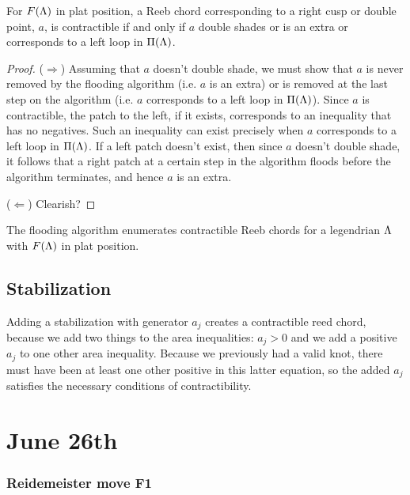 \documentclass[11pt,oneside]{amsart}
\begin{document}
\begin{proposition}
    \label{prop:contractdesc}
    For $F(\Lambda)$ in plat position, a Reeb chord corresponding to a right cusp or double point, $a$, is contractible if and only if $a$ double shades or is an extra or corresponds to a left loop in $\Pi(\Lambda)$.
\end{proposition}

\begin{proof}
    ($\Rightarrow$) Assuming that $a$ doesn't double shade, we must show that $a$ is never removed by the flooding algorithm (i.e. $a$ is an extra) or is removed at the last step on the algorithm (i.e. $a$ corresponds to a left loop in $\Pi(\Lambda)$). Since $a$ is contractible, the patch to the left, if it exists, corresponds to an inequality that has no negatives. Such an inequality can exist precisely when $a$ corresponds to a left loop in $\Pi(\Lambda)$. If a left patch doesn't exist, then since $a$ doesn't double shade, it follows that a right patch at a certain step in the algorithm floods before the algorithm terminates, and hence $a$ is an extra.

    ($\Leftarrow$) Clearish?
\end{proof}

\begin{corollary}
    \label{cor:contractenum}
    The flooding algorithm enumerates contractible Reeb chords for a legendrian $\Lambda$ with $F(\Lambda)$ in plat position.
\end{corollary}


\subsection{Stabilization}
Adding a stabilization with generator $a_j$ creates a contractible reed chord, because we add two things to the area inequalities: $a_j>0$ and we add a positive $a_j$ to one other area inequality. Because we previously had a valid knot, there must have been at least one other positive in this latter equation, so the added $a_j$ satisfies the necessary conditions of contractibility. 

\section{June 26th}

\subsubsection{Reidemeister move F1}
\end{document}
